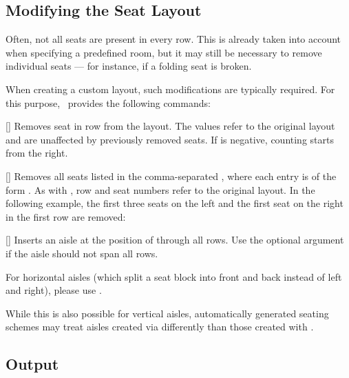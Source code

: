 \documentclass[
babel-options={english},
load-preamble-,
title=compact
]{cnltx-doc}
\begin{document}
\subsection{Modifying the Seat Layout}
\label{sec:modify-layout}
Often, not all seats are present in every row.
This is already taken into account when specifying a predefined room,
but it may still be necessary to remove individual seats — for instance,
if a folding seat is broken.

When creating a custom layout, such modifications are typically required.
For this purpose, \pkg\ provides the following commands:
\begin{commands}
  []
  Removes seat  in row  from the layout.
  The values refer to the original layout and are unaffected by previously removed seats.
  If  is negative, counting starts from the right.

  []
  Removes all seats listed in the comma-separated , where each entry
  is of the form .
  As with , row and seat numbers refer to the original layout.
  In the following example, the first three seats on the left and the first seat
  on the right in the first row are removed: \vspace{-.3\baselineskip}
  
  \begin{example}
  \end{example}\vspace{-1.3\baselineskip}

  []
  Inserts an aisle at the position of  through all rows.
  Use the optional argument if the aisle should not span all rows.

  For horizontal aisles (which split a seat block into front and back instead of
  left and right), 
  please use .

  While this is also possible for vertical aisles, automatically generated
  seating schemes may treat aisles created via  differently
  than those created with .
\end{commands}

\subsection{Output}
\label{sec:drawing}
\end{document}
